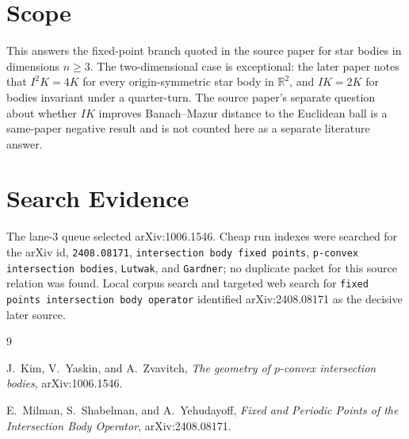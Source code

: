 \documentclass[11pt]{article}
\begin{document}
\section*{Scope}

This answers the fixed-point branch quoted in the source paper for star bodies
in dimensions \(n\geq 3\).  The two-dimensional case is exceptional: the later
paper notes that \(I^2K=4K\) for every origin-symmetric star body in
\(\mathbb R^2\), and \(IK=2K\) for bodies invariant under a quarter-turn.  The
source paper's separate question about whether \(IK\) improves Banach--Mazur
distance to the Euclidean ball is a same-paper negative result and is not
counted here as a separate literature answer.

\section*{Search Evidence}

The lane-3 queue selected arXiv:1006.1546.  Cheap run indexes were searched for
the arXiv id, \texttt{2408.08171}, \texttt{intersection body fixed points},
\texttt{p-convex intersection bodies}, \texttt{Lutwak}, and \texttt{Gardner};
no duplicate packet for this source relation was found.  Local corpus search
and targeted web search for \texttt{fixed points intersection body operator}
identified arXiv:2408.08171 as the decisive later source.

{\raggedright
\begin{thebibliography}{9}

J.~Kim, V.~Yaskin, and A.~Zvavitch,
\emph{The geometry of \(p\)-convex intersection bodies},
arXiv:1006.1546.

E.~Milman, S.~Shabelman, and A.~Yehudayoff,
\emph{Fixed and Periodic Points of the Intersection Body Operator},
arXiv:2408.08171.

\end{thebibliography}
}
\end{document}
